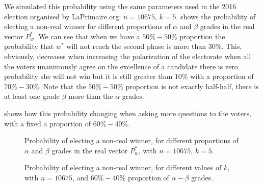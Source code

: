 \documentclass[version=3.21, pagesize, twoside=off, bibliography=totoc, DIV=calc, fontsize=12pt, a4paper]{scrartcl}
\begin{document}
We simulated this probability using the same parameters used in the 2016 election organised by LaPrimaire.org: $n=10675$, $k=5$.  shows the probability of electing a non-real winner for different proportions of $\alpha$ and $\beta$ grades in the real vector $P_w^*$. We can see that when we have a $50\%-50\%$ proportion the probability that $w^*$ will not reach the second phase is more than $30\%$. This, obviously, decreases when increasing the polarization of the electorate \textemdash when all the voters unanimously agree on the excellence of a candidate there is zero probability she will not win \textendash but it is still greater than $10\%$ with a proportion of $70\%-30\%$.  Note that the $50\%-50\%$ proportion is not exactly half-half, there is at least one grade $\beta$ more than the $\alpha$ grades.

 shows how this probability changing when asking more questions to the voters, with a fixed a proportion of $60\%-40\%$. 

\begin{figure}
	\centering
	\caption{Probability of electing a non-real winner, for different proportions of $\alpha$ and $\beta$ grades in the real vector $P_w^*$, with $n=10675$, $k=5$.}
	\label{fig:gradesDistribution}
\end{figure}

\begin{figure}
	\centering
	\caption{Probability of electing a non-real winner, for different values of $k$, with $n=10675$, and $60\%-40\%$ proportion of $\alpha - \beta$ grades.}
	\label{fig:differentK}
\end{figure}
\end{document}
